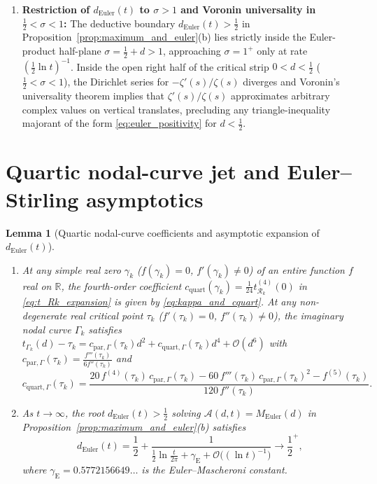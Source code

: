 \documentclass[11pt,a4paper,reqno]{amsart}
\newtheorem{lemma}[theorem]{Lemma}
\theoremstyle{definition}
\theoremstyle{remark}
\numberwithin{equation}{section}
\begin{document}
\begin{enumerate}
\item \textbf{Restriction of $d_{\mathrm{Euler}}(t)$ to $\sigma > 1$ and Voronin universality in $\frac{1}{2} < \sigma < 1$:}
The deductive boundary $d_{\mathrm{Euler}}(t) > \frac{1}{2}$ in Proposition~\ref{prop:maximum_and_euler}(b) lies strictly inside the Euler-product half-plane $\sigma = \frac{1}{2}+d > 1$, approaching $\sigma = 1^+$ only at rate $(\frac{1}{2}\ln t)^{-1}$. Inside the open right half of the critical strip $0 < d < \frac{1}{2}$ ($\frac{1}{2} < \sigma < 1$), the Dirichlet series for $-\zeta'(s)/\zeta(s)$ diverges and Voronin's universality theorem \cite{Voronin1975} implies that $\zeta'(s)/\zeta(s)$ approximates arbitrary complex values on vertical translates, precluding any triangle-inequality majorant of the form \eqref{eq:euler_positivity} for $d < \frac{1}{2}$.
\end{enumerate}

\appendix

\section{Quartic nodal-curve jet and Euler--Stirling asymptotics}\label{app:expansions}

\begin{lemma}[Quartic nodal-curve coefficients and asymptotic expansion of $d_{\mathrm{Euler}}(t)$]\label{lem:app_expansions}
\begin{enumerate}
\item[\textup{(a)}] At any simple real zero $\gamma_k$ ($f(\gamma_k) = 0$, $f'(\gamma_k) \neq 0$) of an entire function $f$ real on $\mathbb{R}$, the fourth-order coefficient $c_{\mathrm{quart}}(\gamma_k) = \frac{1}{24}t_{\mathcal{R}_k}^{(4)}(0)$ in \eqref{eq:t_Rk_expansion} is given by \eqref{eq:kappa_and_cquart}. At any non-degenerate real critical point $\tau_k$ ($f'(\tau_k) = 0$, $f''(\tau_k) \neq 0$), the imaginary nodal curve $\Gamma_k$ satisfies $t_{\Gamma_k}(d) - \tau_k = c_{\mathrm{par},\Gamma}(\tau_k)d^2 + c_{\mathrm{quart},\Gamma}(\tau_k)d^4 + \mathcal{O}(d^6)$ with $c_{\mathrm{par},\Gamma}(\tau_k) = \frac{f'''(\tau_k)}{6f''(\tau_k)}$ and
\begin{equation}\label{eq:cquart_wall}
c_{\mathrm{quart},\Gamma}(\tau_k) = \frac{20\,f^{(4)}(\tau_k)\,c_{\mathrm{par},\Gamma}(\tau_k) - 60\,f'''(\tau_k)\,c_{\mathrm{par},\Gamma}(\tau_k)^2 - f^{(5)}(\tau_k)}{120\,f''(\tau_k)}.
\end{equation}
\item[\textup{(b)}] As $t \to \infty$, the root $d_{\mathrm{Euler}}(t) > \frac{1}{2}$ solving $\mathcal{A}(d, t) = M_{\mathrm{Euler}}(d)$ in Proposition~\ref{prop:maximum_and_euler}(b) satisfies
\begin{equation}\label{eq:d_euler_asymp}
d_{\mathrm{Euler}}(t) = \frac{1}{2} + \frac{1}{\frac{1}{2}\ln\frac{t}{2\pi} + \gamma_{\mathrm{E}} + \mathcal{O}\big((\ln t)^{-1}\big)} \longrightarrow \frac{1}{2}^+,
\end{equation}
where $\gamma_{\mathrm{E}} = 0.5772156649\dots$ is the Euler--Mascheroni constant.
\end{enumerate}
\end{lemma}
\end{document}
